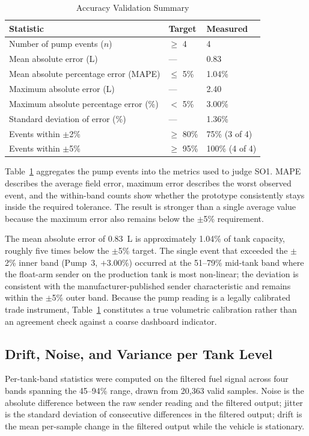 \begin{table}[!htbp]
\centering
\caption{Accuracy Validation Summary}
\label{tab:so1_accuracy_summary}
\scriptsize
\begin{tabular}{|p{}|p{}|p{}|}
\hline
\textbf{Statistic} & \textbf{Target} & \textbf{Measured} \\
\hline
Number of pump events ($n$) & $\geq$ 4 & 4 \\
\hline
Mean absolute error (L) & --- & 0.83 \\
\hline
Mean absolute percentage error (MAPE) & $\leq$ 5\% & 1.04\% \\
\hline
Maximum absolute error (L) & --- & 2.40 \\
\hline
Maximum absolute percentage error (\%) & $<$ 5\% & 3.00\% \\
\hline
Standard deviation of error (\%) & --- & 1.36\% \\
\hline
Events within $\pm$2\% & $\geq$ 80\% & 75\% (3 of 4) \\
\hline
Events within $\pm$5\% & $\geq$ 95\% & 100\% (4 of 4) \\
\hline
\end{tabular}
\normalsize
\end{table}

Table~\ref{tab:so1_accuracy_summary} aggregates the pump events into the metrics used to judge SO1. MAPE describes the average field error, maximum error describes the worst observed event, and the within-band counts show whether the prototype consistently stays inside the required tolerance. The result is stronger than a single average value because the maximum error also remains below the $\pm$5\% requirement.

The mean absolute error of 0.83~L is approximately 1.04\% of tank capacity, roughly five times below the $\pm$5\% target. The single event that exceeded the $\pm$2\% inner band (Pump~3, $+3.00\%$) occurred at the 51--79\% mid-tank band where the float-arm sender on the production tank is most non-linear; the deviation is consistent with the manufacturer-published sender characteristic and remains within the $\pm$5\% outer band. Because the pump reading is a legally calibrated trade instrument, Table~\ref{tab:so1_accuracy_summary} constitutes a true volumetric calibration rather than an agreement check against a coarse dashboard indicator.

\subsection{Drift, Noise, and Variance per Tank Level}
Per-tank-band statistics were computed on the filtered fuel signal across four bands spanning the 45--94\% range, drawn from 20{,}363 valid samples. Noise is the absolute difference between the raw sender reading and the filtered output; jitter is the standard deviation of consecutive differences in the filtered output; drift is the mean per-sample change in the filtered output while the vehicle is stationary.

